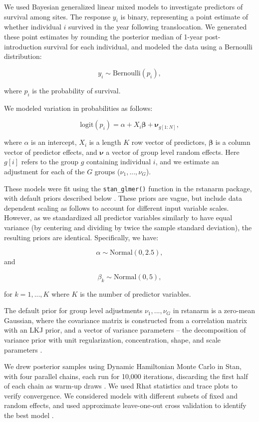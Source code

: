 \documentclass[9pt,twoside,lineno]{pnas-new}
\begin{document}
We used Bayesian generalized linear mixed models to investigate
predictors of survival among sites. The response \(y_i\) is binary,
representing a point estimate of whether individual \(i\) survived in
the year following translocation. We generated these point estimates by
rounding the posterior median of 1-year post-introduction survival for
each individual, and modeled the data using a Bernoulli distribution:

\[y_i \sim \text{Bernoulli}(p_i),\]

where \(p_i\) is the probability of survival.

We modeled variation in probabilities as follows:

\[\text{logit}(p_i) = \alpha + X_i \pmb \beta + \pmb \nu_{g[1:N]},\]

where \(\alpha\) is an intercept, \(X_i\) is a length \(K\) row vector
of predictors, \(\pmb \beta\) is a column vector of predictor effects,
and \(\pmb \nu\) a vector of group level random effects. Here \(g[i]\)
refers to the group \(g\) containing individual \(i\), and we estimate
an adjustment for each of the \(G\) groups (\(\nu_1, ..., \nu_G\)).

These models were fit using the \texttt{stan\_glmer()} function in the
rstanarm package, with default priors described below
\citep{rstanarm2022}. These priors are vague, but include data dependent
scaling as follows to account for different input variable scales.
However, as we standardized all predictor variables similarly to have
equal variance (by centering and dividing by twice the sample standard
deviation), the resulting priors are identical. Specifically, we have:

\[\alpha \sim \text{Normal}(0, 2.5),\] and

\[\beta_k \sim \text{Normal}(0, 5),\]

for \(k=1, ..., K\) where \(K\) is the number of predictor variables.

The default prior for group level adjustments \(\nu_1, ..., \nu_G\) in
rstanarm is a zero-mean Gaussian, where the covariance matrix is
constructed from a correlation matrix with an LKJ prior, and a vector of
variance parameters -- the decomposition of variance prior with unit
regularization, concentration, shape, and scale parameters
\citep{lewandowski2009}.

We drew posterior samples using Dynamic Hamiltonian Monte Carlo in Stan,
with four parallel chains, each run for 10,000 iterations, discarding
the first half of each chain as warm-up draws \citep{rstanarm2022}. We
used Rhat statistics and trace plots to verify convergence. We
considered models with different subsets of fixed and random effects,
and used approximate leave-one-out cross validation to identify the best
model \citep{vehtari2016}.
\end{document}
